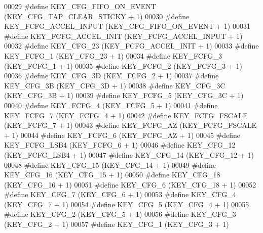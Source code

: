 \begin{DoxyCode}
00029 \textcolor{preprocessor}{#define KEY\_CFG\_FIFO\_ON\_EVENT       (KEY\_CFG\_TAP\_CLEAR\_STICKY + 1)}
00030 \textcolor{preprocessor}{#define KEY\_FCFG\_ACCEL\_INPUT        (KEY\_CFG\_FIFO\_ON\_EVENT + 1)}
00031 \textcolor{preprocessor}{#define KEY\_FCFG\_ACCEL\_INIT         (KEY\_FCFG\_ACCEL\_INPUT + 1)}
00032 \textcolor{preprocessor}{#define KEY\_CFG\_23                  (KEY\_FCFG\_ACCEL\_INIT + 1)}
00033 \textcolor{preprocessor}{#define KEY\_FCFG\_1                  (KEY\_CFG\_23 + 1)}
00034 \textcolor{preprocessor}{#define KEY\_FCFG\_3                  (KEY\_FCFG\_1 + 1)}
00035 \textcolor{preprocessor}{#define KEY\_FCFG\_2                  (KEY\_FCFG\_3 + 1)}
00036 \textcolor{preprocessor}{#define KEY\_CFG\_3D                  (KEY\_FCFG\_2 + 1)}
00037 \textcolor{preprocessor}{#define KEY\_CFG\_3B                  (KEY\_CFG\_3D + 1)}
00038 \textcolor{preprocessor}{#define KEY\_CFG\_3C                  (KEY\_CFG\_3B + 1)}
00039 \textcolor{preprocessor}{#define KEY\_FCFG\_5                  (KEY\_CFG\_3C + 1)}
00040 \textcolor{preprocessor}{#define KEY\_FCFG\_4                  (KEY\_FCFG\_5 + 1)}
00041 \textcolor{preprocessor}{#define KEY\_FCFG\_7                  (KEY\_FCFG\_4 + 1)}
00042 \textcolor{preprocessor}{#define KEY\_FCFG\_FSCALE             (KEY\_FCFG\_7 + 1)}
00043 \textcolor{preprocessor}{#define KEY\_FCFG\_AZ                 (KEY\_FCFG\_FSCALE + 1)}
00044 \textcolor{preprocessor}{#define KEY\_FCFG\_6                  (KEY\_FCFG\_AZ + 1)}
00045 \textcolor{preprocessor}{#define KEY\_FCFG\_LSB4               (KEY\_FCFG\_6 + 1)}
00046 \textcolor{preprocessor}{#define KEY\_CFG\_12                  (KEY\_FCFG\_LSB4 + 1)}
00047 \textcolor{preprocessor}{#define KEY\_CFG\_14                  (KEY\_CFG\_12 + 1)}
00048 \textcolor{preprocessor}{#define KEY\_CFG\_15                  (KEY\_CFG\_14 + 1)}
00049 \textcolor{preprocessor}{#define KEY\_CFG\_16                  (KEY\_CFG\_15 + 1)}
00050 \textcolor{preprocessor}{#define KEY\_CFG\_18                  (KEY\_CFG\_16 + 1)}
00051 \textcolor{preprocessor}{#define KEY\_CFG\_6                   (KEY\_CFG\_18 + 1)}
00052 \textcolor{preprocessor}{#define KEY\_CFG\_7                   (KEY\_CFG\_6 + 1)}
00053 \textcolor{preprocessor}{#define KEY\_CFG\_4                   (KEY\_CFG\_7 + 1)}
00054 \textcolor{preprocessor}{#define KEY\_CFG\_5                   (KEY\_CFG\_4 + 1)}
00055 \textcolor{preprocessor}{#define KEY\_CFG\_2                   (KEY\_CFG\_5 + 1)}
00056 \textcolor{preprocessor}{#define KEY\_CFG\_3                   (KEY\_CFG\_2 + 1)}
00057 \textcolor{preprocessor}{#define KEY\_CFG\_1                   (KEY\_CFG\_3 + 1)}

\end{DoxyCode}
